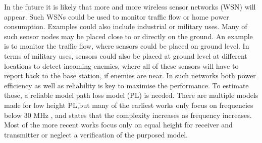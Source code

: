 
In the future it is likely that more and more wireless sensor networks (WSN) will appear. Such WSNs could be used to monitor traffic flow or home power consumption. Examples could also include industrial or military uses. Many of such sensor nodes may be placed close to or directly on the ground. An example is to monitor the traffic flow, where sensors could be placed on ground level. In terms of military uses, sensors could also be placed at ground level at different locations to detect incoming enemies, where all of these sensors will have to report back to the base station, if enemies are near. In such networks both power efficiency as well as reliability is key to maximise the performance. To estimate those, a reliable model path loss model (PL) is needed.
There are multiple models made for low height PL,but many of the earliest works only focus on frequencies below 30 MHz \cite{Bullington}, and states that the complexity increases as frequency increases. Most of the more recent works focus only on equal height for receiver and transmitter or neglect a verification of the purposed model. 


